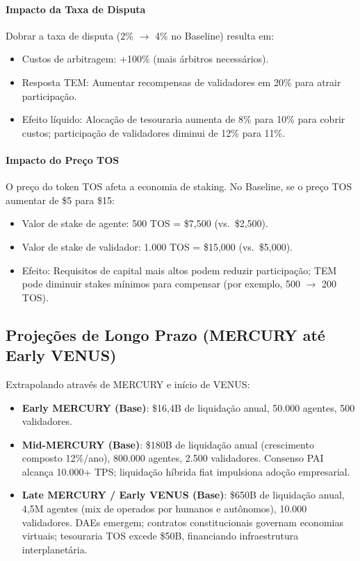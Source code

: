 \documentclass[11pt]{article}
\begin{document}
\begin{itemize}[noitemsep]
\begin{itemize}[noitemsep]
\begin{itemize}[noitemsep]
\paragraph{Impacto da Taxa de Disputa}
Dobrar a taxa de disputa (2\% $\to$ 4\% no Baseline) resulta em:
\begin{itemize}[noitemsep]
  \item Custos de arbitragem: +100\% (mais árbitros necessários).
  \item Resposta TEM: Aumentar recompensas de validadores em 20\% para atrair participação.
  \item Efeito líquido: Alocação de tesouraria aumenta de 8\% para 10\% para cobrir custos; participação de validadores diminui de 12\% para 11\%.
\end{itemize}

\paragraph{Impacto do Preço TOS}
O preço do token TOS afeta a economia de staking. No Baseline, se o preço TOS aumentar de \$5 para \$15:
\begin{itemize}[noitemsep]
  \item Valor de stake de agente: 500 TOS = \$7{,}500 (vs.\ \$2{,}500).
  \item Valor de stake de validador: 1.000 TOS = \$15{,}000 (vs.\ \$5{,}000).
  \item Efeito: Requisitos de capital mais altos podem reduzir participação; TEM pode diminuir stakes mínimos para compensar (por exemplo, 500 $\to$ 200 TOS).
\end{itemize}

\subsection{Projeções de Longo Prazo (MERCURY até Early VENUS)}
Extrapolando através de MERCURY e início de VENUS:
\begin{itemize}[noitemsep]
  \item \textbf{Early MERCURY (Base)}: \$16,4B de liquidação anual, 50.000 agentes, 500 validadores.
  \item \textbf{Mid-MERCURY (Base)}: \$180B de liquidação anual (crescimento composto 12\%/ano), 800.000 agentes, 2.500 validadores. Consenso PAI alcança 10.000+ TPS; liquidação híbrida fiat impulsiona adoção empresarial.
  \item \textbf{Late MERCURY / Early VENUS (Base)}: \$650B de liquidação anual, 4,5M agentes (mix de operados por humanos e autônomos), 10.000 validadores. DAEs emergem; contratos constitucionais governam economias virtuais; tesouraria TOS excede \$50B, financiando infraestrutura interplanetária.
\end{itemize}


\end{itemize}
\end{itemize}
\end{itemize}
\end{document}
